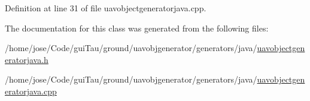 Definition at line 31 of file uavobjectgeneratorjava.\-cpp.



The documentation for this class was generated from the following files\-:\begin{DoxyCompactItemize}
\item 
/home/jose/\-Code/gui\-Tau/ground/uavobjgenerator/generators/java/\hyperlink{uavobjectgeneratorjava_8h}{uavobjectgeneratorjava.\-h}\item 
/home/jose/\-Code/gui\-Tau/ground/uavobjgenerator/generators/java/\hyperlink{uavobjectgeneratorjava_8cpp}{uavobjectgeneratorjava.\-cpp}\end{DoxyCompactItemize}
